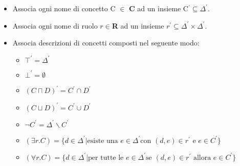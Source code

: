 \documentclass[../main.tex]{subfiles}
\begin{document}
   \begin{itemize}
      \item Associa ogni nome di concetto C $\in$ \textbf{C} ad un insieme C$^\prime \subseteq \Delta^\prime$.
      \item Associa ogni nome di ruolo $r \in$\textbf{R} ad un insieme $r^\prime \subseteq \Delta^\prime \times \Delta^\prime$.
      \item Associa descrizioni di concetti composti nel seguente modo:
      \begin{itemize}
         \item $\top^\prime = \Delta^\prime$
         \item $\bot^\prime = \emptyset$
         \item $(C \sqcap D)^\prime = C^\prime \cap D^\prime$
         \item $(C \sqcup D)^\prime = C^\prime \cup D^\prime$
         \item $\lnot C^\prime = \Delta^\prime \backslash C^\prime$
         \item $(\exists r.C) = \{ d \in \Delta^\prime | \text{esiste una } e \in \Delta^\prime \text{con } (d,e) \in r^\prime \text{ e } e \in C^\prime\}$
         \item $(\forall r.C) = \{ d \in \Delta^\prime | \text{per tutte le } e \in \Delta^\prime \text{se } (d,e) \in r^\prime \text{ allora } e \in C^\prime\}$
      \end{itemize} 
   \end{itemize} 
\end{document}
